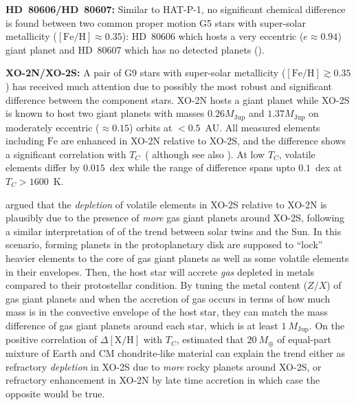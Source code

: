 \documentclass[modern, letterpaper]{aastex61}
\newcommand*\elem[1]{\ensuremath{\mathrm{#1}}}
\newcommand*\elemH[1]{\ensuremath{[\mathrm{#1}/\elem{H}]}}
\newcommand*{\feh}{\ensuremath{\elemH{Fe}}}
\newcommand{\Tcondens}{\ensuremath{T_C}}
\newcommand{\mearth}{\ensuremath{M_\oplus}}
\newcommand{\mjupiter}{\ensuremath{M_\mathrm{Jup}}}
\begin{document}
{\bf HD~80606/HD~80607:}
Similar to HAT-P-1, no significant chemical difference is found between two
common proper motion G5 stars with super-solar metallicity ($\feh \approx
0.35$): HD~80606 which hosts a very eccentric ($e\approx0.94$) giant planet and
HD~80607 which has no detected planets (\citealt{Saffe:2015aa,Mack:2016aa}).

{\bf XO-2N/XO-2S:}
A pair of G9 stars with super-solar metallicity ($\feh \gtrsim 0.35$)
has received much attention due to possibly the most robust and significant
difference between the component stars.
XO-2N hosts a giant planet while XO-2S is known to host two giant planets with
masses $0.26 \mjupiter$ and $1.37 \mjupiter$ on moderately eccentric ($\approx
0.15$) orbits at $<0.5$~AU.
All measured elements including \elem{Fe} are enhanced in XO-2N relative to
XO-2S, and the difference shows a significant correlation with \Tcondens\
(\citealt{Teske:2015aa,Ramirez:2015aa,Biazzo:2015aa} although see also
\citealt{Teske:2013aa}).
At low \Tcondens, volatile elements differ by $0.015$~dex while the range of
difference spans upto $0.1$~dex at $\Tcondens>1600$~K.

\citealt{Ramirez:2015aa} argued that the {\it depletion} of volatile elements
in XO-2S relative to XO-2N is plausibly due to the presence of {\it more} gas
giant planets around XO-2S, following a similar interpretation of
\citealt{Melendez:2009aa} of the trend between solar twins and the Sun.
In this scenario, forming planets in the protoplanetary disk are supposed to
``lock'' heavier elements to the core of gas giant planets as well as some
volatile elements in their envelopes. Then, the host star will accrete {\it
  gas} depleted in metals compared to their protostellar condition.
By tuning the metal content ($Z/X$) of gas giant planets and when the accretion
of gas occurs in terms of how much mass is in the convective envelope of the
host star, they can match the mass difference of gas giant planets around each
star, which is at least $1~\mjupiter$.
On the positive correlation of $\Delta\elemH{X}$ with \Tcondens,
\citealt{Ramirez:2015aa} estimated that $20~\mearth$ of equal-part mixture of
Earth and CM chondrite-like material can explain the trend either as refractory
{\it depletion} in XO-2S due to {\it more} rocky planets around XO-2S, or
refractory enhancement in XO-2N by late time accretion in which case the
opposite would be true.
\end{document}
